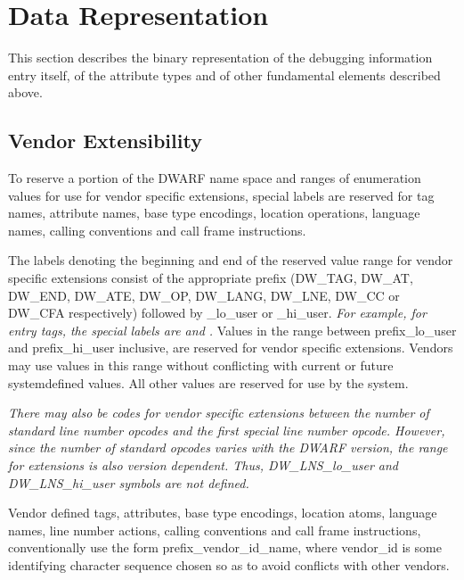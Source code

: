\chapter{Data Representation}
\label{datarep:datarepresentation}

This section describes the binary representation of the
debugging information entry itself, of the attribute types
and of other fundamental elements described above.


\section{Vendor Extensibility}
\label{datarep:vendorextensibility}

To reserve a portion of the DWARF name space and ranges of
enumeration values for use for vendor specific extensions,
special labels are reserved for tag names, attribute names,
base type encodings, location operations, language names,
calling conventions and call frame instructions.

The labels denoting the beginning and end of the reserved
value range for vendor specific extensions consist of the
appropriate prefix (DW\-\_TAG, DW\-\_AT, DW\-\_END, DW\-\_ATE, DW\-\_OP,
DW\-\_LANG, DW\-\_LNE, DW\-\_CC or DW\-\_CFA respectively) followed by
\_lo\_user or \_hi\_user. 
\textit{For example, for entry tags, the special
labels are  and 
.}
Values in the
range between prefix\_lo\_user and prefix\_hi\_user inclusive,
are reserved for vendor specific extensions. Vendors may
use values in this range without conflicting with current or
future system\dash defined values. All other values are reserved
for use by the system.

\textit{There may also be codes for vendor specific extensions
between the number of standard line number opcodes and
the first special line number opcode. However, since the
number of standard opcodes varies with the DWARF version,
the range for extensions is also version dependent. Thus,
DW\-\_LNS\-\_lo\-\_user and DW\-\_LNS\-\_hi\-\_user symbols are not defined.}

Vendor defined tags, attributes, base type encodings, location
atoms, language names, line number actions, calling conventions
and call frame instructions, conventionally use the form
prefix\_vendor\_id\_name, where vendor\_id is some identifying
character sequence chosen so as to avoid conflicts with
other vendors.

